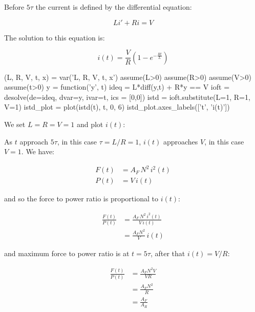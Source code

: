 \documentclass[]{../common/elementary-physics}
\begin{document}
Before $5 \tau$ the current is defined by the differential equation:

\begin{equation}
L i' + R i = V
\end{equation}

The solution to this equation is:

\begin{equation}
i(t) = \frac{V}{R} (1 - e^{- \frac{R t}{L}})
\end{equation}

\begin{sagesilent}
(L, R, V, t, x) = var('L, R, V, t, x')
assume(L>0)
assume(R>0)
assume(V>0)
assume(t>0)
y = function('y', t)
ideq = L*diff(y,t) + R*y == V
ioft = desolve(de=ideq, dvar=y, ivar=t, ics = [0,0])
istd = ioft.substitute(L=1, R=1, V=1)
istd_plot = plot(istd(t), t, 0, 6)
istd_plot.axes_labels(['t', 'i(t)'])
\end{sagesilent}

We set $L = R = V = 1$ and plot $i(t)$:


As $t$ approach $5\tau$, in this case $\tau = L/R = 1$, $i(t)$ approaches $V$, in this case $V=1$.
We have:

\begin{subequations}
\begin{align}
F(t) &= A_F \, N^2 \, i^2(t) \\
P(t) &= V \, i(t)
\end{align}
\end{subequations}

and so the force to power ratio is proportional to $i(t)$:

\begin{subequations}
\begin{align}
\frac{F(t)}{P(t)} &= \frac{A_F \, N^2 \, i^2(t)}{V \, i(t)} \\
&= \frac{A_F N^2}{V} \, i(t)
\end{align}
\end{subequations}

and maximum force to power ratio is at $t = 5 \tau$, after that $i(t) = V/R$:

\begin{subequations}
\begin{align}
\frac{F(t)}{P(t)} &= \frac{A_F N^2 V}{V R} \\
&= \frac{A_F N^2}{R} \\
&= \frac{A_F}{A_R}
\end{align}
\end{subequations}
\end{document}
